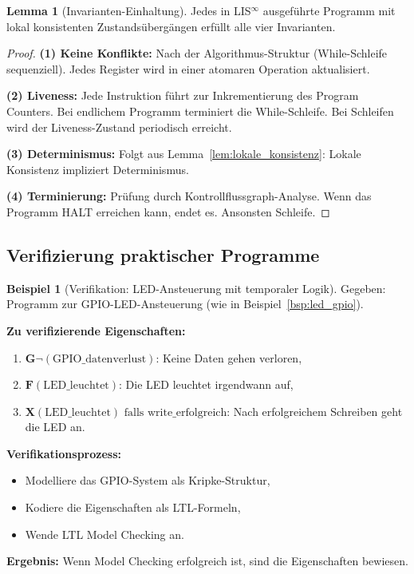\documentclass[a4paper,12pt]{article}
\theoremstyle{definition}
\newtheorem{beispiel}{Beispiel}
\newtheorem{lemma}{Lemma}
\begin{document}
\begin{lemma}[Invarianten-Einhaltung]
	\label{lem:invarianten}
	Jedes in LIS$^{\infty}$ ausgeführte Programm mit lokal konsistenten Zustandsübergängen erfüllt alle vier Invarianten.
\end{lemma}

\begin{proof}
	\textbf{(1) Keine Konflikte:} Nach der Algorithmus-Struktur (While-Schleife sequenziell). Jedes Register wird in einer atomaren Operation aktualisiert.
	
	\textbf{(2) Liveness:} Jede Instruktion führt zur Inkrementierung des Program Counters. Bei endlichem Programm terminiert die While-Schleife. Bei Schleifen wird der Liveness-Zustand periodisch erreicht.
	
	\textbf{(3) Determinismus:} Folgt aus Lemma~\ref{lem:lokale_konsistenz}: Lokale Konsistenz impliziert Determinismus.
	
	\textbf{(4) Terminierung:} Prüfung durch Kontrollflussgraph-Analyse. Wenn das Programm HALT erreichen kann, endet es. Ansonsten Schleife.
\end{proof}

\subsection{Verifizierung praktischer Programme}

\begin{beispiel}[Verifikation: LED-Ansteuerung mit temporaler Logik]
	\label{bsp:verify_led}
	Gegeben: Programm zur GPIO-LED-Ansteuerung (wie in Beispiel~\ref{bsp:led_gpio}).
	
	\textbf{Zu verifizierende Eigenschaften:}
	\begin{enumerate}
		\item $\mathbf{G}\neg(\text{GPIO\_datenverlust})$: Keine Daten gehen verloren,
		\item $\mathbf{F}(\text{LED\_leuchtet})$: Die LED leuchtet irgendwann auf,
		\item $\mathbf{X}(\text{LED\_leuchtet}) \text{ falls } \text{write\_erfolgreich}$: Nach erfolgreichem Schreiben geht die LED an.
	\end{enumerate}
	
	\textbf{Verifikationsprozess:}
	\begin{itemize}
		\item Modelliere das GPIO-System als Kripke-Struktur,
		\item Kodiere die Eigenschaften als LTL-Formeln,
		\item Wende LTL Model Checking an.
	\end{itemize}
	
	\textbf{Ergebnis:} Wenn Model Checking erfolgreich ist, sind die Eigenschaften bewiesen.
\end{beispiel}
\end{document}
